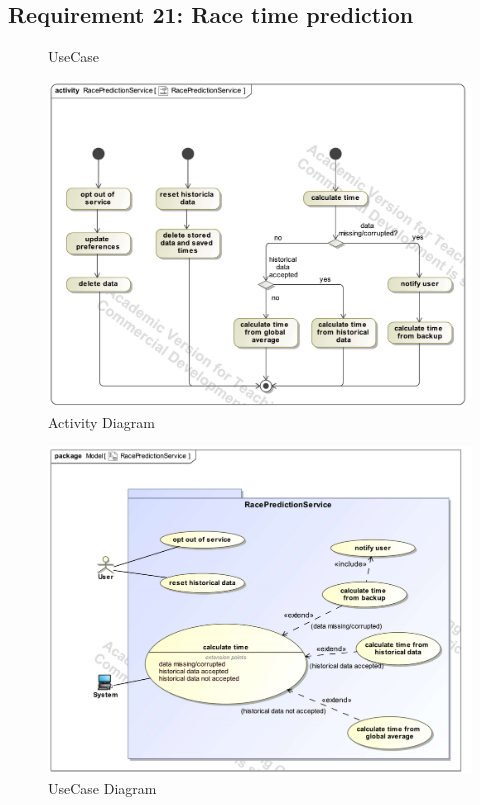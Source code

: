 \documentclass{article}
\begin{document}
	\subsection{Requirement 21: Race time prediction}
		\begin{figure}[h!]
			\centering
			\captionsetup{labelformat=empty}
			\caption{UseCase}
		\end{figure}
		\clearpage
		\begin{figure}[h!]
		    	\centering
		   	\captionsetup{labelformat=empty}
		   	\caption{Activity Diagram}
		    	\includegraphics[width=\textwidth, angle=0]{Marc/race/RacePredictionServiceActivity.pdf}
		\end{figure}
		\clearpage
		\begin{figure}[h!]
			\centering
			\captionsetup{labelformat=empty}
			\caption{UseCase Diagram}
		    	\includegraphics[width=\textwidth, angle=0]{Marc/race/RacePredictionServiceUseCase.pdf}
		\end{figure}
\end{document}
